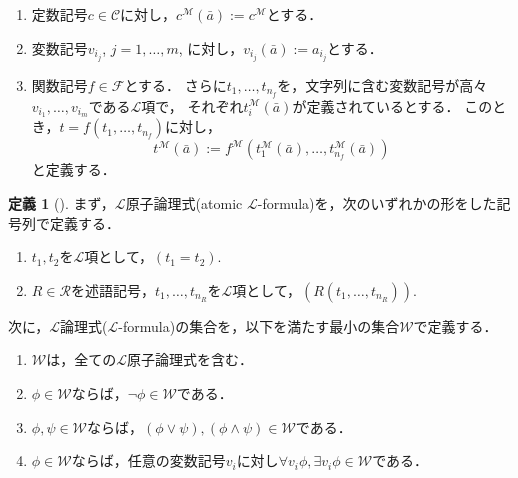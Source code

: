 \documentclass[uplatex, dvipdfmx]{jsarticle}
\numberwithin{equation}{section}
\theoremstyle{definition}
\newtheorem{definition}{定義}[section]
\begin{document}
\begin{enumerate}
     \item 定数記号$c \in \mathcal{C}$に対し，$c^\mathcal{M}(\bar{a}) := c^\mathcal{M}$とする．
     \item 変数記号$v_{i_j}$, $j=1, \dots, m$, に対し，$v_{i_j}(\bar{a}) := a_{i_j}$とする．
     \item 
     関数記号$f \in \mathcal{F}$とする．
     さらに$t_1, \dots, t_{n_f}$を，文字列に含む変数記号が高々$v_{i_1}, \dots, v_{i_m}$である$\mathcal{L}$項で，
     それぞれ$t_i^\mathcal{M}(\bar{a})$が定義されているとする．
     このとき，$t = f(t_1, \dots, t_{n_f})$に対し，
     \begin{equation}
          t^\mathcal{M}(\bar{a}):= f^\mathcal{M}(t_1^\mathcal{M}(\bar{a}), \dots, t_{n_f}^\mathcal{M}(\bar{a}))
     \end{equation}
     と定義する．
\end{enumerate}

\begin{definition}[{\cite[Definition 1.1.5]{MR1924282}}]
     まず，$\mathcal{L}$原子論理式(atomic $\mathcal{L}$-formula)を，次のいずれかの形をした記号列で定義する．
     \begin{enumerate}
          \item $t_1, t_2$を$\mathcal{L}$項として，$(t_1 = t_2)$.
          \item $R \in \mathcal{R}$を述語記号，$t_1, \dots, t_{n_R}$を$\mathcal{L}$項として，$(R(t_1, \dots, t_{n_R}))$.
     \end{enumerate}

     次に，$\mathcal{L}$論理式($\mathcal{L}$-formula)の集合を，以下を満たす最小の集合$\mathcal{W}$で定義する．
     \begin{enumerate}
          \item $\mathcal{W}$は，全ての$\mathcal{L}原子論理式$を含む．
          \item $\phi \in \mathcal{W}$ならば，$\lnot \phi \in \mathcal{W}$である．
          \item $\phi, \psi \in \mathcal{W}$ならば，$(\phi \lor \psi), (\phi \land \psi) \in \mathcal{W}$である．
          \item $\phi \in \mathcal{W}$ならば，任意の変数記号$v_i$に対し$\forall v_i \phi, \exists v_i \phi \in \mathcal{W}$である．
     \end{enumerate}
\end{definition}

\end{document}
